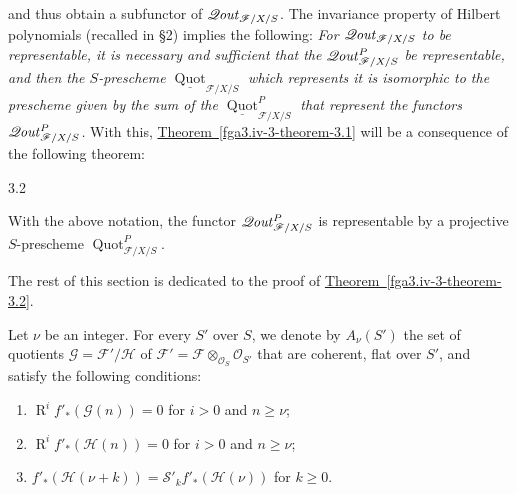   and thus obtain a subfunctor of \(\mathscr {Q}\kern  -.75pt\mathit {out}_{\mathscr {F}/X/S}\).
  The invariance property of Hilbert polynomials (recalled in §2) implies the following:
  \emph{For \(\mathscr {Q}\kern  -.75pt\mathit {out}_{\mathscr {F}/X/S}\) to be representable, it is necessary and sufficient that the \(\mathscr {Q}\kern  -.75pt\mathit {out}_{\mathscr {F}/X/S}^P\) be representable, and then the \(S\)-prescheme \(\underline {\operatorname {Quot}}_{{\mathscr {F}/X/S}}\) which represents it is isomorphic to the prescheme given by the sum of the \(\underline {\operatorname {Quot}}_{{\mathscr {F}/X/S}}^P\) that represent the functors \(\mathscr {Q}\kern  -.75pt\mathit {out}_{\mathscr {F}/X/S}^P\).}
  With this, \hyperref[fga3.iv-3-theorem-3.1]{Theorem~\ref*{fga3.iv-3-theorem-3.1}} will be a consequence of the following theorem:\begin{theorem}{3.2}\label{fga3.iv-3-theorem-3.2}\skipsinglepar\par{}With the above notation, the functor \(\mathscr {Q}\kern  -.75pt\mathit {out}_{\mathscr {F}/X/S}^P\) is representable by a projective \(S\)-prescheme \(\operatorname {Quot}_{\mathscr {F}/X/S}^P\).\end{theorem}\par{}The rest of this section is dedicated to the proof of \hyperref[fga3.iv-3-theorem-3.2]{Theorem~\ref*{fga3.iv-3-theorem-3.2}}.\par{}Let \(\nu \) be an integer.
  For every \(S'\) over \(S\), we denote by \(A_\nu (S')\) the set of quotients \(\mathscr {G}=\mathscr {F}'/\mathscr {H}\) of \(\mathscr {F}'=\mathscr {F}\otimes _{\mathcal {O}_S}\mathcal {O}_{S'}\) that are coherent, flat over \(S'\), and satisfy the following conditions:

  
 \begin{enumerate}
    
 \item[a.]
      \(\operatorname {R}^i f'_*(\mathscr {G} (n))=0\) for \(i>0\) and \(n\geqslant \nu \);
    

    
 \item[b.]
      \(\operatorname {R}^i f'_*(\mathscr {H} (n))=0\) for \(i>0\) and \(n\geqslant \nu \);
    

    
 \item[c.]
      \(f'_*(\mathscr {H} (\nu +k))=\mathcal {S}'_k f'_*(\mathscr {H} (\nu ))\) for \(k\geqslant 0\).
    

  \end{enumerate}


